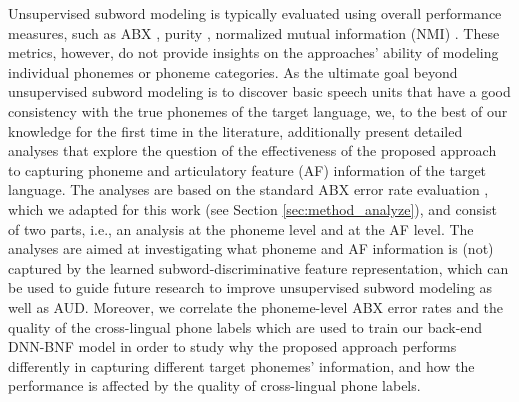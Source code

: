 \documentclass[transmag]{IEEEtran}
\begin{document}
Unsupervised subword modeling is typically evaluated using overall performance measures, such as ABX  \cite{versteegh2015zero,dunbar2017zero}, purity \cite{I3EWang}, normalized mutual information (NMI) \cite{ondel2018bayesian}. These metrics, however, do not provide insights on the approaches’ ability of modeling individual phonemes or phoneme categories. As the ultimate goal beyond unsupervised subword modeling is to discover basic speech units that have a good consistency with the true phonemes of the target language, we, to the best of our knowledge for the first time in the literature, additionally present detailed analyses that explore the question of the effectiveness of the proposed approach to capturing phoneme and articulatory feature (AF) information of the target language. %
The analyses are based on the standard ABX error rate evaluation \cite{versteegh2015zero}, which we adapted for this work (see Section \ref{sec:method_analyze}), and consist of two parts, i.e., an analysis at the phoneme level and at the AF level. The analyses are aimed at investigating what phoneme and AF information is (not) captured by the learned subword-discriminative feature representation, which can be used to guide future research to improve unsupervised subword modeling as well as AUD. Moreover, we correlate the phoneme-level ABX error rates and the quality of the cross-lingual phone labels which are used to train our back-end DNN-BNF model in order to study why the proposed approach performs differently in capturing different target phonemes' information, and how the performance is affected by the quality of cross-lingual phone labels. 
\end{document}

